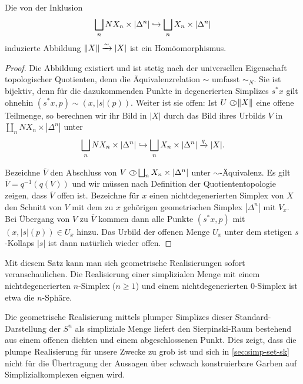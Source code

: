 \begin{satz}
  Die von der Inklusion
  \[ \bigsqcup_n NX_n \times |\Delta^n| \hookrightarrow \bigsqcup_n X_n \times |\Delta^n| \]
  induzierte Abbildung $\|X\| \xrightarrow[]{\sim} |X|$ ist ein Homöomorphismus.
\end{satz}
\begin{proof}
  Die Abbildung existiert und ist stetig nach der universellen
  Eigenschaft topologischer Quotienten, denn die Äquivalenzrelation
  $\sim$ umfasst $\sim_N$. Sie ist bijektiv, denn für die
  dazukommenden Punkte in degenerierten Simplizes $s^* x$ gilt ohnehin
  $(s^* x, p) \sim (x, |s|(p))$. Weiter ist sie offen: Ist $U \subset\kern-0.58em\circ
  \|X\|$ eine offene Teilmenge, so berechnen wir ihr Bild in $|X|$
  durch das Bild ihres Urbilds $V$ in $\coprod_n NX_n \times
  |\Delta^n|$ unter
  \[ \bigsqcup_n NX_n \times |\Delta^n|
  \hookrightarrow \bigsqcup_n X_n \times |\Delta^n| \xrightarrow{q} |X|. \]

  Bezeichne $\overline{V}$ den Abschluss von $V \subset\kern-0.58em\circ \bigsqcup_n X_n
  \times |\Delta^n|$ unter $\sim$-Äquivalenz. Es gilt $\overline{V} =
  q^{-1}(q(V))$ und wir müssen nach Definition der Quotiententopologie
  zeigen, dass $\overline{V}$ offen ist. Bezeichne für $x$ einen
  nichtdegenerierten Simplex von $X$ den Schnitt von $V$ mit dem zu
  $x$ gehörigen geometrischen Simplex $|\Delta^n|$ mit $V_x$. Bei
  Übergang von $V$ zu $\overline{V}$ kommen dann alle Punkte $(s^* x,
  p)$ mit $(x, |s|(p)) \in U_x$ hinzu. Das Urbild der offenen Menge $U_x$
  unter dem stetigen $s$-Kollaps $|s|$ ist dann natürlich wieder
  offen.
\end{proof}
\begin{bsp} \label{ex:real-sphere}
  Mit diesem Satz kann man sich geometrische Realisierungen sofort
  veranschaulichen. Die Realisierung einer simplizialen Menge mit
  einem nichtdegenerierten $n$-Simplex ($n \geq 1$) und einem
  nichtdegenerierten $0$-Simplex ist etwa die $n$-Sphäre.
\end{bsp}
\begin{bsp} \label{ex:clumsy-sphere}
  Die geometrische Realisierung mittels plumper Simplizes dieser
  Standard-Darstellung der $S^n$ als simpliziale Menge liefert den
  Sierpinski-Raum bestehend aus einem offenen dichten und einem
  abgeschlossenen Punkt. Dies zeigt, dass die plumpe Realisierung für
  unsere Zwecke zu grob ist und sich in \ref{sec:simp-set-sk} nicht
  für die Übertragung der Aussagen über schwach konstruierbare Garben
  auf Simplizialkomplexen eignen wird.
\end{bsp}

